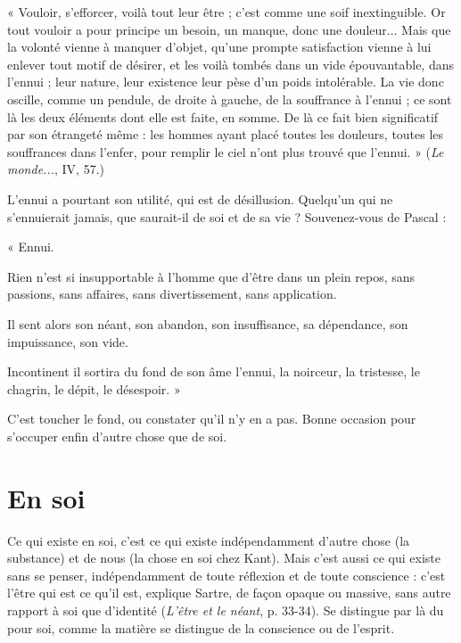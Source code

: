 \vspace{0.5cm}
{\footnotesize
« Vouloir, s’efforcer, voilà tout leur être ; c’est comme une soif inextinguible. Or tout
vouloir a pour principe un besoin, un manque, donc une douleur... Mais que la
volonté vienne à manquer d’objet, qu’une prompte satisfaction vienne à lui enlever
tout motif de désirer, et les voilà tombés dans un vide épouvantable, dans l'ennui ; leur
nature, leur existence leur pèse d’un poids intolérable. La vie donc oscille, comme un
pendule, de droite à gauche, de la souffrance à l'ennui ; ce sont là les deux éléments
dont elle est faite, en somme. De là ce fait bien significatif par son étrangeté même : les
hommes ayant placé toutes les douleurs, toutes les souffrances dans l’enfer, pour remplir
le ciel n’ont plus trouvé que l'ennui. » ({\it Le monde...}, IV, 57.)
}

\vspace{0.5cm}
L’ennui a pourtant son utilité, qui est de désillusion. Quelqu'un qui ne
s’ennuierait jamais, que saurait-il de soi et de sa vie ? Souvenez-vous de Pascal :

\vspace{0.5cm}
{\footnotesize
« Ennui.

Rien n’est si insupportable à l’homme que d’être dans un plein repos, sans passions,
sans affaires, sans divertissement, sans application.

Il sent alors son néant, son abandon, son insuffisance, sa dépendance, son impuissance,
son vide.

Incontinent il sortira du fond de son âme l'ennui, la noirceur, la tristesse, le chagrin,
le dépit, le désespoir. »
}

\vspace{0.5cm}
C’est toucher le fond, ou constater qu’il n’y en a pas. Bonne occasion pour
s'occuper enfin d’autre chose que de soi.

\section{En soi}
Ce qui existe en soi, c’est ce qui existe indépendamment d’autre
chose (la substance) et de nous (la chose en soi chez Kant). Mais
c'est aussi ce qui existe sans se penser, indépendamment de toute réflexion et
de toute conscience : c’est l’être qui est ce qu’il est, explique Sartre, de façon
opaque ou massive, sans autre rapport à soi que d'identité ({\it L'être et le néant},
p. 33-34). Se distingue par là du pour soi, comme la matière se distingue de la
conscience ou de l’esprit.

